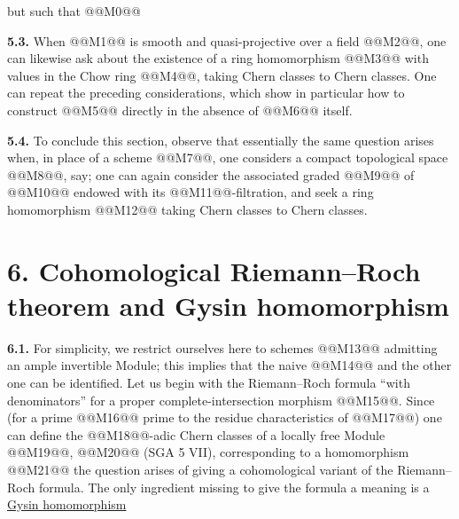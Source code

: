 but such that
@@M0@@

\textbf{5.3.} When @@M1@@ is smooth and quasi-projective over a field @@M2@@, one can likewise ask about the existence of a ring homomorphism
@@M3@@
with values in the Chow ring @@M4@@, taking Chern classes to Chern classes. One can repeat the preceding considerations, which show in particular how to construct @@M5@@ directly in the absence of @@M6@@ itself.

\textbf{5.4.} To conclude this section, observe that essentially the same question arises when, in place of a scheme @@M7@@, one considers a compact topological space @@M8@@, say; one can again consider the associated graded @@M9@@ of @@M10@@ endowed with its @@M11@@-filtration, and seek a ring homomorphism
@@M12@@
taking Chern classes to Chern classes.

\section*{6. Cohomological Riemann--Roch theorem and Gysin homomorphism}

\textbf{6.1.} For simplicity, we restrict ourselves here to schemes @@M13@@ admitting an ample invertible Module; this implies that the naive @@M14@@ and the other one can be identified. Let us begin with the Riemann--Roch formula ``with denominators'' for a proper complete-intersection morphism @@M15@@. Since (for a prime @@M16@@ prime to the residue characteristics of @@M17@@) one can define the @@M18@@-adic Chern classes of a locally free Module @@M19@@,
@@M20@@
(SGA 5 VII), corresponding to a homomorphism
@@M21@@
the question arises of giving a cohomological variant of the Riemann--Roch formula. The only ingredient missing to give the formula a meaning is a \uline{Gysin homomorphism}
